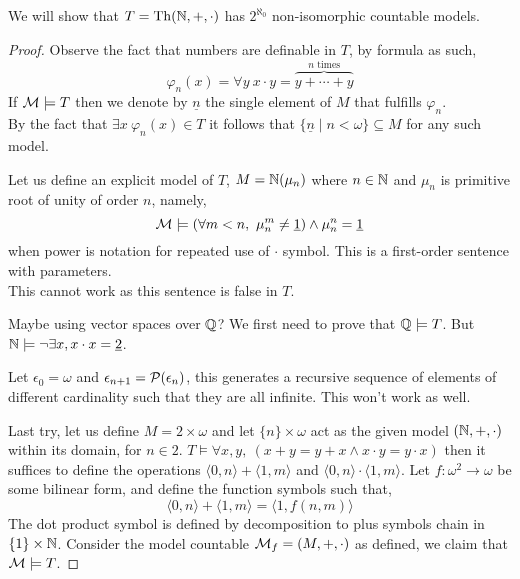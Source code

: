 \question{}
We will show that $T = \operatorname{Th}(\mathbb{N}, +, \cdot)$ has $2^{\aleph_0}$ non-isomorphic countable models.
\begin{proof}
	Observe the fact that numbers are definable in $T$, by formula as such,
	\[
		\varphi_{n}(x) = \forall y\ x \cdot y = \overbrace{y + \cdots + y}^{\text{$n$ times}}
	\]
	If $\mathcal{M} \models T$ then we denote by $\underline{n}$ the single element of $M$ that fulfills $\varphi_{n}$. \\
	By the fact that $\exists x\ \varphi_n(x) \in T$ it follows that $\{ \underline{n} \mid n < \omega \} \subseteq M$ for any such model.

	Let us define an explicit model of $T$, $M = \mathbb{N}(\mu_n)$ where $n \in \mathbb{N}$ and $\mu_n$ is primitive root of unity of order $n$, namely,
	\[
		\Mm \models (\forall m < n,\ \mu_n^m \ne \underline{1}) \land \mu_n^n = \underline{1}
	\]
	when power is notation for repeated use of $\cdot$ symbol.
	This is a first-order sentence with parameters. \\
	This cannot work as this sentence is false in $T$.

	Maybe using vector spaces over $\mathbb{Q}$?
	We first need to prove that $\mathbb{Q} \models T$.
	But $\mathbb{N} \models \lnot \exists x, x \cdot x = \underline{2}$.

	Let $\epsilon_0 = \omega$ and $\epsilon_{n + 1} = \mathcal{P}(\epsilon_n)$, this generates a recursive sequence of elements of different cardinality such that they are all infinite.
	This won't work as well.

	Last try, let us define $M = 2 \times \omega$ and let $\{ n \} \times \omega$ act as the given model $(\mathbb{N}, +, \cdot)$ within its domain, for $n \in 2$.
	$T \models \forall x, y,\ (x + y = y + x \land x \cdot y = y \cdot x)$ then it suffices to define the operations $\langle 0, n \rangle + \langle 1, m \rangle$ and $\langle 0, n \rangle \cdot \langle 1, m \rangle$.
	Let $f : \omega^2 \to \omega$ be some bilinear form, and define the function symbols such that,
	\[
		\langle 0, n \rangle + \langle 1, m \rangle
		= \langle 1, f(n, m) \rangle
	\]
	The dot product symbol is defined by decomposition to plus symbols chain in $\{ 1 \} \times \mathbb{N}$.
	Consider the model countable $\mathcal{M}_f = (M, +, \cdot)$ as defined, we claim that $\mathcal{M} \models T$.
\end{proof}

